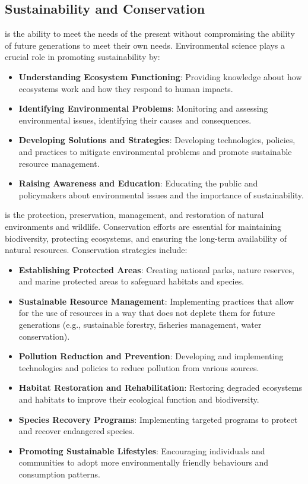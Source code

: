 \subsection{Sustainability and Conservation}

 is the ability to meet the needs of the present without compromising the ability of future generations to meet their own needs.  Environmental science plays a crucial role in promoting sustainability by:

\begin{itemize}
    \item \textbf{Understanding Ecosystem Functioning}:  Providing knowledge about how ecosystems work and how they respond to human impacts.
    \item \textbf{Identifying Environmental Problems}:  Monitoring and assessing environmental issues, identifying their causes and consequences.
    \item \textbf{Developing Solutions and Strategies}:  Developing technologies, policies, and practices to mitigate environmental problems and promote sustainable resource management.
    \item \textbf{Raising Awareness and Education}:  Educating the public and policymakers about environmental issues and the importance of sustainability.
\end{itemize}

 is the protection, preservation, management, and restoration of natural environments and wildlife.  Conservation efforts are essential for maintaining biodiversity, protecting ecosystems, and ensuring the long-term availability of natural resources.  Conservation strategies include:

\begin{itemize}
    \item \textbf{Establishing Protected Areas}:  Creating national parks, nature reserves, and marine protected areas to safeguard habitats and species.
    \item \textbf{Sustainable Resource Management}:  Implementing practices that allow for the use of resources in a way that does not deplete them for future generations (e.g., sustainable forestry, fisheries management, water conservation).
    \item \textbf{Pollution Reduction and Prevention}:  Developing and implementing technologies and policies to reduce pollution from various sources.
    \item \textbf{Habitat Restoration and Rehabilitation}:  Restoring degraded ecosystems and habitats to improve their ecological function and biodiversity.
    \item \textbf{Species Recovery Programs}:  Implementing targeted programs to protect and recover endangered species.
    \item \textbf{Promoting Sustainable Lifestyles}:  Encouraging individuals and communities to adopt more environmentally friendly behaviours and consumption patterns.
\end{itemize}

